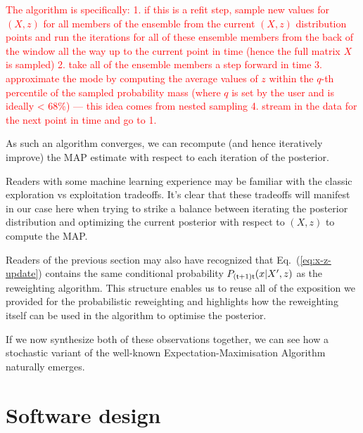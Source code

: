 \textcolor{red}{The algorithm is specifically: 
1. if this is a refit step, sample new values for $(X,z)$ for all members of the ensemble from the current $(X,z)$ distribution points and run the iterations for all of these ensemble members from the back of the window all the way up to the current point in time (hence the full matrix $X$ is sampled)
2. take all of the ensemble members a step forward in time
3. approximate the mode by computing the average values of $z$ within the $q$-th percentile of the sampled probability mass (where $q$ is set by the user and is ideally < 68\%) --- this idea comes from nested sampling
4. stream in the data for the next point in time and go to 1.}


As such an algorithm converges, we can recompute (and hence iteratively improve) the MAP estimate with respect to each iteration of the posterior.

Readers with some machine learning experience may be familiar with the classic exploration vs exploitation tradeoffs. It's clear that these tradeoffs will manifest in our case here when trying to strike a balance between iterating the posterior distribution and optimizing the current posterior with respect to $(X,z)$ to compute the MAP. 

Readers of the previous section may also have recognized that Eq.~(\ref{eq:x-z-update}) contains the same conditional probability $P_{({\sf t}+1){\sf t}}(x\vert X',z)$ as the reweighting algorithm. This structure enables us to reuse all of the exposition we provided for the probabilistic reweighting and highlights how the reweighting itself can be used in the algorithm to optimise the posterior.   

If we now synthesize both of these observations together, we can see how a stochastic variant of the well-known Expectation-Maximisation Algorithm~\cite{hartley1958maximum, dempster1977maximum, murphy2012machine} naturally emerges.

\section{\sffamily Software design}

